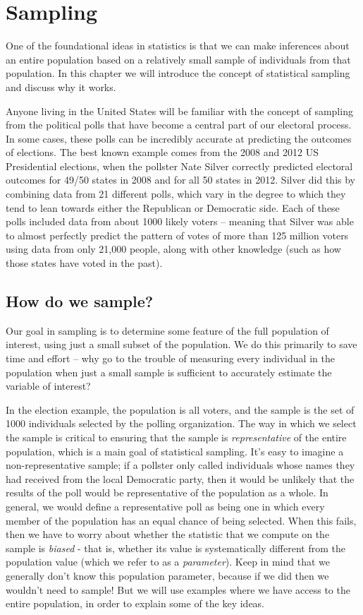 \documentclass[]{book}
\theoremstyle{definition}
\theoremstyle{definition}
\theoremstyle{definition}
\theoremstyle{remark}
\begin{document}
\chapter{Sampling}\label{sampling-1}

One of the foundational ideas in statistics is that we can make
inferences about an entire population based on a relatively small sample
of individuals from that population. In this chapter we will introduce
the concept of statistical sampling and discuss why it works.

Anyone living in the United States will be familiar with the concept of
sampling from the political polls that have become a central part of our
electoral process. In some cases, these polls can be incredibly accurate
at predicting the outcomes of elections. The best known example comes
from the 2008 and 2012 US Presidential elections, when the pollster Nate
Silver correctly predicted electoral outcomes for 49/50 states in 2008
and for all 50 states in 2012. Silver did this by combining data from 21
different polls, which vary in the degree to which they tend to lean
towards either the Republican or Democratic side. Each of these polls
included data from about 1000 likely voters -- meaning that Silver was
able to almost perfectly predict the pattern of votes of more than 125
million voters using data from only 21,000 people, along with other
knowledge (such as how those states have voted in the past).

\section{How do we sample?}\label{how-do-we-sample}

Our goal in sampling is to determine some feature of the full population
of interest, using just a small subset of the population. We do this
primarily to save time and effort -- why go to the trouble of measuring
every individual in the population when just a small sample is
sufficient to accurately estimate the variable of interest?

In the election example, the population is all voters, and the sample is
the set of 1000 individuals selected by the polling organization. The
way in which we select the sample is critical to ensuring that the
sample is \emph{representative} of the entire population, which is a
main goal of statistical sampling. It's easy to imagine a
non-representative sample; if a pollster only called individuals whose
names they had received from the local Democratic party, then it would
be unlikely that the results of the poll would be representative of the
population as a whole. In general, we would define a representative poll
as being one in which every member of the population has an equal chance
of being selected. When this fails, then we have to worry about whether
the statistic that we compute on the sample is \emph{biased} - that is,
whether its value is systematically different from the population value
(which we refer to as a \emph{parameter}). Keep in mind that we
generally don't know this population parameter, because if we did then
we wouldn't need to sample! But we will use examples where we have
access to the entire population, in order to explain some of the key
ideas.
\end{document}
